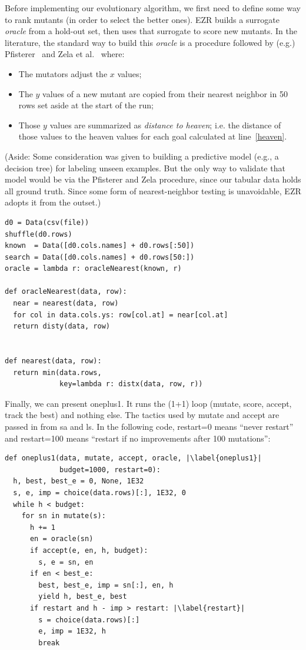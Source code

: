 \documentclass[AMA,STIX2COL]{WileyNJDv5}
\begin{document}
Before implementing our evolutionary algorithm, we first need to
define some way to rank mutants (in order to select the better
ones). EZR builds a surrogate {\em oracle} from a hold-out set,
then uses that surrogate to score new mutants. In the literature,
the standard way to build this {\em oracle} is a procedure followed
by (e.g.) Pfisterer~\cite{pfisterer2022yahpo} and Zela et
al.~\cite{zela2020surrogate} where:
\begin{itemize}
\item The mutators adjust the $x$ values;
\item The $y$ values of a new mutant are copied from their nearest
neighbor in 50 rows set aside at the start of the run;
\item Those $y$ values are summarized as {\em distance to heaven};
i.e. the distance of those values to the \textsf{heaven} values
for each goal calculated at line~\ref{heaven}.
\end{itemize}
		(Aside: Some
consideration was given to building a predictive model (e.g., a
decision tree) for labeling   unseen examples. But the
only way to validate that  model would be via the Pfisterer
and Zela procedure, since our tabular data holds all   ground
truth. Since some form of nearest-neighbor testing is unavoidable,
		EZR adopts it from the outset.)
\begin{lstlisting}
d0 = Data(csv(file))   
shuffle(d0.rows)
known  = Data([d0.cols.names] + d0.rows[:50])
search = Data([d0.cols.names] + d0.rows[50:])
oracle = lambda r: oracleNearest(known, r)

def oracleNearest(data, row): 
  near = nearest(data, row)
  for col in data.cols.ys: row[col.at] = near[col.at]
  return disty(data, row)
  

def nearest(data, row): 
  return min(data.rows, 
             key=lambda r: distx(data, row, r))
\end{lstlisting}
Finally, we can present \textsf{oneplus1}.   It runs the (1+1) loop
(mutate, score, accept, track the best) and nothing else. The
tactics used by \textsf{mutate} and \textsf{accept} are passed in
from \textsf{sa} and \textsf{ls}.
In the following code,
\textsf{restart=0} means ``never restart'' and \textsf{restart=100}
means ``restart if no improvements after 100 mutations'':
\begin{lstlisting}
def oneplus1(data, mutate, accept, oracle, |\label{oneplus1}|
             budget=1000, restart=0): 
  h, best, best_e = 0, None, 1E32
  s, e, imp = choice(data.rows)[:], 1E32, 0
  while h < budget:
    for sn in mutate(s):
      h += 1
      en = oracle(sn)
      if accept(e, en, h, budget):
        s, e = sn, en
      if en < best_e:
        best, best_e, imp = sn[:], en, h
        yield h, best_e, best
      if restart and h - imp > restart: |\label{restart}|
        s = choice(data.rows)[:]
        e, imp = 1E32, h
        break
\end{lstlisting}
\end{document}
